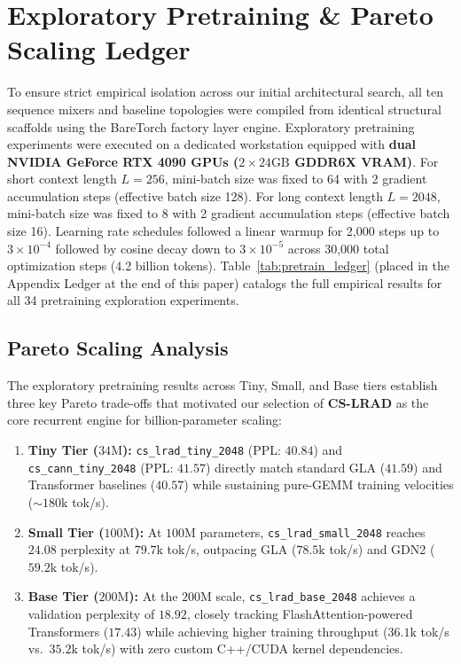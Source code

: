 \documentclass[twocolumn,10pt]{article}
\begin{document}
\section{Exploratory Pretraining \& Pareto Scaling Ledger}
To ensure strict empirical isolation across our initial architectural search, all ten sequence mixers and baseline topologies were compiled from identical structural scaffolds using the BareTorch factory layer engine. Exploratory pretraining experiments were executed on a dedicated workstation equipped with \textbf{dual NVIDIA GeForce RTX 4090 GPUs ($2 \times 24\text{GB}$ GDDR6X VRAM)}. For short context length $L=256$, mini-batch size was fixed to 64 with 2 gradient accumulation steps (effective batch size 128). For long context length $L=2048$, mini-batch size was fixed to 8 with 2 gradient accumulation steps (effective batch size 16). Learning rate schedules followed a linear warmup for 2,000 steps up to $3 \times 10^{-4}$ followed by cosine decay down to $3 \times 10^{-5}$ across 30,000 total optimization steps (4.2 billion tokens). Table~\ref{tab:pretrain_ledger} (placed in the Appendix Ledger at the end of this paper) catalogs the full empirical results for all 34 pretraining exploration experiments.

\subsection{Pareto Scaling Analysis}
The exploratory pretraining results across Tiny, Small, and Base tiers establish three key Pareto trade-offs that motivated our selection of \textbf{CS-LRAD} as the core recurrent engine for billion-parameter scaling:
\begin{enumerate}
    \item \textbf{Tiny Tier ($34\text{M}$):} \texttt{cs\_lrad\_tiny\_2048} (PPL: $40.84$) and \texttt{cs\_cann\_tiny\_2048} (PPL: $41.57$) directly match standard GLA ($41.59$) and Transformer baselines ($40.57$) while sustaining pure-GEMM training velocities ($\sim 180\text{k}$ tok/s).
    \item \textbf{Small Tier ($100\text{M}$):} At $100\text{M}$ parameters, \texttt{cs\_lrad\_small\_2048} reaches $24.08$ perplexity at $79.7\text{k}$ tok/s, outpacing GLA ($78.5\text{k}$ tok/s) and GDN2 ($59.2\text{k}$ tok/s).
    \item \textbf{Base Tier ($200\text{M}$):} At the $200\text{M}$ scale, \texttt{cs\_lrad\_base\_2048} achieves a validation perplexity of $18.92$, closely tracking FlashAttention-powered Transformers ($17.43$) while achieving higher training throughput ($36.1\text{k}$ tok/s vs.\ $35.2\text{k}$ tok/s) with zero custom C++/CUDA kernel dependencies.
\end{enumerate}
\end{document}
